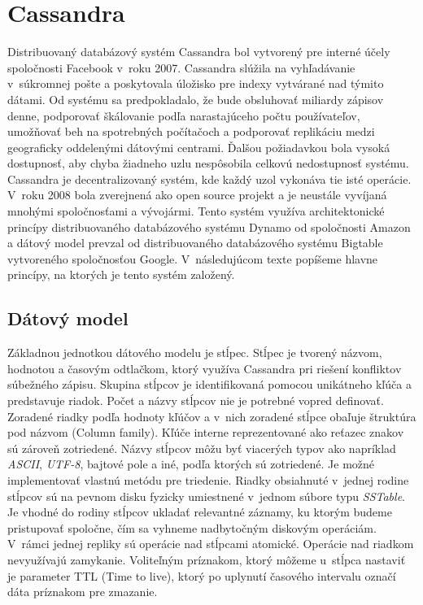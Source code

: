 \documentclass[11pt,twoside,a4paper]{book}
\begin{document}
\chapter{Cassandra}


Distribuovaný databázový systém Cassandra \cite{cassandraW} bol vytvorený pre interné účely spoločnosti Facebook v~roku 2007. Cassandra slúžila na vyhľadávanie v~súkromnej pošte a poskytovala úložisko pre indexy vytvárané nad týmito dátami. Od systému sa predpokladalo, že bude obsluhovať miliardy zápisov denne, podporovať škálovanie podľa narastajúceho počtu používateľov, umožňovať beh na spotrebných počítačoch a podporovať replikáciu medzi geograficky oddelenými dátovými centrami. Ďalšou požiadavkou bola vysoká dostupnosť, aby chyba žiadneho uzlu nespôsobila celkovú nedostupnosť systému. Cassandra je decentralizovaný systém, kde každý uzol vykonáva tie isté operácie. V~roku 2008 bola zverejnená ako open source projekt a je neustále vyvíjaná mnohými spoločnosťami a vývojármi. Tento systém využíva architektonické princípy distribuovaného databázového systému Dynamo \cite{decandia2007dynamo} od spoločnosti Amazon a dátový model prevzal od distribuovaného databázového systému Bigtable vytvoreného spoločnosťou Google. V~následujúcom texte popíšeme hlavne princípy, na ktorých je tento systém založený.


\section{Dátový model}
Základnou jednotkou dátového modelu je stĺpec. Stĺpec je tvorený názvom, hodnotou a časovým odtlačkom, ktorý využíva Cassandra pri riešení konfliktov súbežného zápisu. Skupina stĺpcov je identifikovaná pomocou unikátneho kľúča a predstavuje riadok. Počet a názvy stĺpcov nie je potrebné vopred definovať. Zoradené riadky podľa hodnoty kľúčov a v~nich zoradené stĺpce obaľuje štruktúra pod názvom \emph{} (Column family). Kľúče interne reprezentované ako reťazec znakov sú zároveň zotriedené. Názvy stĺpcov môžu byť viacerých typov ako napríklad \emph{ASCII}, \emph{UTF-8}, bajtové pole a iné, podľa ktorých sú zotriedené. Je možné implementovať vlastnú metódu pre triedenie. Riadky obsiahnuté v~jednej rodine stĺpcov sú na pevnom disku fyzicky umiestnené v~jednom súbore typu \emph{SSTable}. Je vhodné do rodiny stĺpcov ukladať relevantné záznamy, ku ktorým budeme pristupovať spoločne, čím sa vyhneme nadbytočným diskovým operáciám. V~rámci jednej repliky sú operácie nad stĺpcami atomické. Operácie nad riadkom nevyužívajú zamykanie. Voliteľným príznakom, ktorý môžeme u~stĺpca nastaviť je parameter TTL (Time to live), ktorý po uplynutí časového intervalu označí dáta príznakom pre zmazanie.
\end{document}
